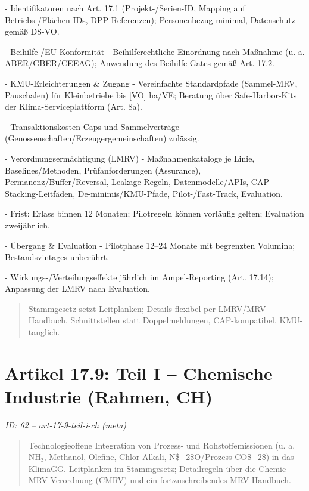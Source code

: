 \documentclass[12pt,a4paper]{scrartcl}
\begin{document}
- Identifikatoren nach Art. 17.1 (Projekt-/Serien-ID, Mapping auf Betriebs-/Flächen-IDs, DPP-Referenzen); Personenbezug minimal, Datenschutz gemäß DS-VO.

- Beihilfe-/EU-Konformität
- Beihilferechtliche Einordnung nach Maßnahme (u. a. ABER/GBER/CEEAG); Anwendung des Beihilfe-Gates gemäß Art. 17.2.

- KMU-Erleichterungen \& Zugang
- Vereinfachte Standardpfade (Sammel-MRV, Pauschalen) für Kleinbetriebe bis [VO] ha/VE; Beratung über Safe-Harbor-Kits der Klima-Serviceplattform (Art. 8a).

- Transaktionskosten-Caps und Sammelverträge (Genossenschaften/Erzeugergemeinschaften) zulässig.

- Verordnungsermächtigung (LMRV)
- Maßnahmenkataloge je Linie, Baselines/Methoden, Prüfanforderungen (Assurance), Permanenz/Buffer/Reversal, Leakage-Regeln, Datenmodelle/APIs, CAP-Stacking-Leitfäden, De-minimis/KMU-Pfade, Pilot-/Fast-Track, Evaluation.

- Frist: Erlass binnen 12 Monaten; Pilotregeln können vorläufig gelten; Evaluation zweijährlich.

- Übergang \& Evaluation
- Pilotphase 12--24 Monate mit begrenzten Volumina; Bestandsvintages unberührt.

- Wirkungs-/Verteilungseffekte jährlich im Ampel-Reporting (Art. 17.14); Anpassung der LMRV nach Evaluation.

{\footnotesize\begin{quote}
Stammgesetz setzt Leitplanken; Details flexibel per LMRV/MRV-Handbuch. Schnittstellen statt Doppelmeldungen, CAP-kompatibel, KMU-tauglich.
\end{quote}}



\section[Artikel 17.9: Teil I -- Chemische Industrie (Rahmen, CH)]{Artikel 17.9: Teil I -- Chemische Industrie (Rahmen, CH)}
\noindent\textit{ID: 62 -- art-17-9-teil-i-ch (meta)}

\begin{quote}
Technologieoffene Integration von Prozess- und Rohstoffemissionen (u. a. NH₃, Methanol, Olefine, Chlor-Alkali, N\$\_2\$O/Prozess-CO\$\_2\$) in das KlimaGG. Leitplanken im Stammgesetz; Detailregeln über die Chemie-MRV-Verordnung (CMRV) und ein fortzuschreibendes MRV-Handbuch.
\end{quote}
\end{document}
